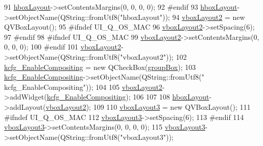 \begin{DoxyCode}
91         \hyperlink{classUi__DlgPerformanceBase_af14f550725818437cba053b3da16ef8a}{hboxLayout}->setContentsMargins(0, 0, 0, 0);
92 \textcolor{preprocessor}{#endif}
93         \hyperlink{classUi__DlgPerformanceBase_af14f550725818437cba053b3da16ef8a}{hboxLayout}->setObjectName(QString::fromUtf8(\textcolor{stringliteral}{"hboxLayout"}));
94         \hyperlink{classUi__DlgPerformanceBase_a7daf9953a4d7a2ceebaac14b9e556d40}{vboxLayout2} = \textcolor{keyword}{new} QVBoxLayout();
95 \textcolor{preprocessor}{#ifndef UI\_Q\_OS\_MAC}
96         \hyperlink{classUi__DlgPerformanceBase_a7daf9953a4d7a2ceebaac14b9e556d40}{vboxLayout2}->setSpacing(6);
97 \textcolor{preprocessor}{#endif}
98 \textcolor{preprocessor}{#ifndef UI\_Q\_OS\_MAC}
99         \hyperlink{classUi__DlgPerformanceBase_a7daf9953a4d7a2ceebaac14b9e556d40}{vboxLayout2}->setContentsMargins(0, 0, 0, 0);
100 \textcolor{preprocessor}{#endif}
101         \hyperlink{classUi__DlgPerformanceBase_a7daf9953a4d7a2ceebaac14b9e556d40}{vboxLayout2}->setObjectName(QString::fromUtf8(\textcolor{stringliteral}{"vboxLayout2"}));
102         \hyperlink{classUi__DlgPerformanceBase_a0a5b7fdc59983df4f9a1cae459eaa783}{kcfg\_EnableCompositing} = \textcolor{keyword}{new} QCheckBox(\hyperlink{classUi__DlgPerformanceBase_a95446d4eb7ed6bca1d9ab130459e2026}{groupBox});
103         \hyperlink{classUi__DlgPerformanceBase_a0a5b7fdc59983df4f9a1cae459eaa783}{kcfg\_EnableCompositing}->setObjectName(QString::fromUtf8(\textcolor{stringliteral}{"
      kcfg\_EnableCompositing"}));
104 
105         \hyperlink{classUi__DlgPerformanceBase_a7daf9953a4d7a2ceebaac14b9e556d40}{vboxLayout2}->addWidget(\hyperlink{classUi__DlgPerformanceBase_a0a5b7fdc59983df4f9a1cae459eaa783}{kcfg\_EnableCompositing});
106 
107 
108         \hyperlink{classUi__DlgPerformanceBase_af14f550725818437cba053b3da16ef8a}{hboxLayout}->addLayout(\hyperlink{classUi__DlgPerformanceBase_a7daf9953a4d7a2ceebaac14b9e556d40}{vboxLayout2});
109 
110         \hyperlink{classUi__DlgPerformanceBase_a353ef6aa2acdcffede6a00356a036484}{vboxLayout3} = \textcolor{keyword}{new} QVBoxLayout();
111 \textcolor{preprocessor}{#ifndef UI\_Q\_OS\_MAC}
112         \hyperlink{classUi__DlgPerformanceBase_a353ef6aa2acdcffede6a00356a036484}{vboxLayout3}->setSpacing(6);
113 \textcolor{preprocessor}{#endif}
114         \hyperlink{classUi__DlgPerformanceBase_a353ef6aa2acdcffede6a00356a036484}{vboxLayout3}->setContentsMargins(0, 0, 0, 0);
115         \hyperlink{classUi__DlgPerformanceBase_a353ef6aa2acdcffede6a00356a036484}{vboxLayout3}->setObjectName(QString::fromUtf8(\textcolor{stringliteral}{"vboxLayout3"}));

\end{DoxyCode}
